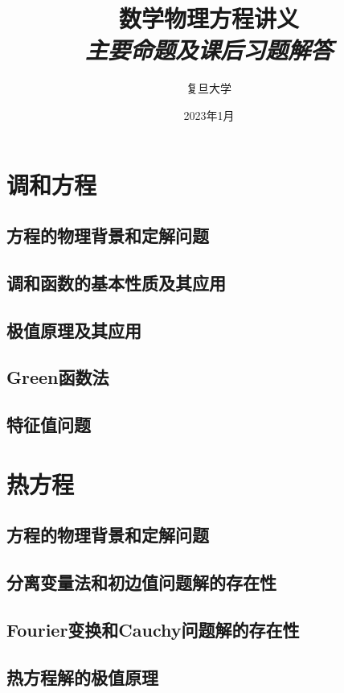 \documentclass[a4paper, openright]{ctexbook}
\title{\textbf{数学物理方程讲义}\\\textit{主要命题及课后习题解答}}
\author{复旦大学}
\date{2023年1月}
\begin{document}
	\maketitle
	\pagestyle{empty}
	\begin{multicols}{2}
		\tableofcontents
	\end{multicols}
	\thispagestyle{empty}
	\cleardoublepage
	\pagestyle{empty}

	\newpage
	\pagestyle{headings}
	\chapter{调和方程}
		\section{方程的物理背景和定解问题}
		\section{调和函数的基本性质及其应用}
		\section{极值原理及其应用}
		\section{Green函数法}
		\section{特征值问题}
	\chapter{热方程}
		\section{方程的物理背景和定解问题}
		\section{分离变量法和初边值问题解的存在性}
		\section{Fourier变换和Cauchy问题解的存在性}
		\section{热方程解的极值原理}
\end{document}
